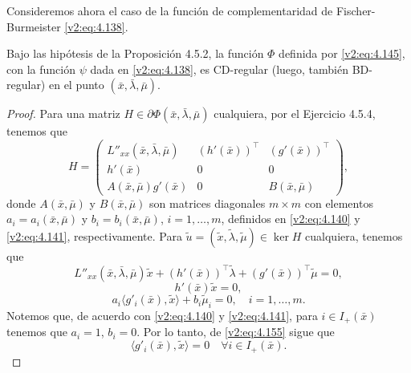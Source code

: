 Consideremos ahora el caso de la función de complementaridad de Fischer-Burmeister \eqref{v2:eq:4.138}.

\begin{proposition}\label{v2:prop:4.5.3}
    Bajo las hipótesis de la Proposición 4.5.2, la función $\Phi$ definida por \eqref{v2:eq:4.145}, con la función $\psi$ dada en \eqref{v2:eq:4.138}, es CD-regular (luego, también BD-regular) en el punto $(\bar{x}, \bar{\lambda}, \bar{\mu})$.
\end{proposition}
\begin{proof}
    Para una matriz $H \in \partial \Phi(\bar{x}, \bar{\lambda}, \bar{\mu})$ cualquiera, por el Ejercicio 4.5.4, tenemos que
    \[
        H = \begin{pmatrix} L''_{xx}(\bar{x}, \bar{\lambda}, \bar{\mu}) & (h'(\bar{x}))^\top & (g'(\bar{x}))^\top \\
        h'(\bar{x}) & 0 & 0 \\
        A(\bar{x}, \bar{\mu})g'(\bar{x}) & 0 & B(\bar{x}, \bar{\mu}) \end{pmatrix},
    \]
    donde $A(\bar{x}, \bar{\mu})$ y $B(\bar{x}, \bar{\mu})$ son matrices diagonales $m \times m$ con elementos $a_i = a_i(\bar{x}, \bar{\mu})$ y $b_i = b_i(\bar{x}, \bar{\mu})$, $i = 1, \dots, m$, definidos en \eqref{v2:eq:4.140} y \eqref{v2:eq:4.141}, respectivamente.
    Para $\tilde{u} = (\tilde{x}, \tilde{\lambda}, \tilde{\mu}) \in \ker H$ cualquiera, tenemos que
    \begin{equation}
        L''_{xx}(\bar{x}, \bar{\lambda}, \bar{\mu})\tilde{x} + (h'(\bar{x}))^\top\tilde{\lambda} + (g'(\bar{x}))^\top\tilde{\mu} = 0,
        \label{v2:eq:4.153_b}
    \end{equation}
    \begin{equation}
        h'(\bar{x})\tilde{x} = 0,
        \label{v2:eq:4.154}
    \end{equation}
    \begin{equation}
        a_i \langle g'_i(\bar{x}), \tilde{x} \rangle + b_i \tilde{\mu}_i = 0, \quad i = 1, \dots, m.
        \label{v2:eq:4.155}
    \end{equation}
    Notemos que, de acuerdo con \eqref{v2:eq:4.140} y \eqref{v2:eq:4.141}, para $i \in I_+(\bar{x})$ tenemos que $a_i = 1$, $b_i = 0$. Por lo tanto, de \eqref{v2:eq:4.155} sigue que
    \begin{equation}
        \langle g'_i(\bar{x}), \tilde{x} \rangle = 0 \quad \forall i \in I_+(\bar{x}).

\end{equation}
\end{proof}
